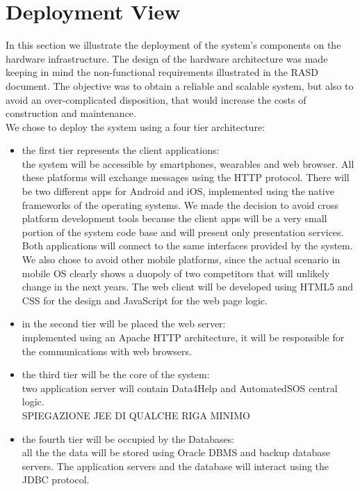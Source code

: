 \section{Deployment	View}
In this section we illustrate the deployment of the system's components on the hardware infrastructure.
The design of the hardware architecture was made keeping in mind the non-functional requirements illustrated in the RASD document. The objective was to obtain a reliable and scalable system, but also to avoid an over-complicated disposition, that would increase the costs of construction and maintenance. \\
We chose to deploy the system using a four tier architecture:
\begin{itemize}
    \item the first tier represents the client applications:\\the system will be accessible by smartphones, wearables and web browser. All these platforms will exchange messages using the HTTP protocol. There will be two different apps for Android and iOS, implemented using the native frameworks of the operating systems. We made the decision to avoid cross platform development tools because the client apps will be a very small portion of the system code base and will present only presentation services. Both applications will connect to the same interfaces provided by the system. We also chose to avoid other mobile platforms, since the actual scenario in mobile OS clearly shows a duopoly of two competitors that will unlikely change in the next years.
    The web client will be developed using HTML5 and CSS for the design and JavaScript for the web page logic.
    \item in the second tier will be placed the web server:\\implemented using an Apache HTTP architecture, it will be responsible  for the communications with web browsers.
    \item the third tier will be the core of the system:\\two application server will contain Data4Help and AutomatedSOS central logic.\\SPIEGAZIONE JEE DI QUALCHE RIGA MINIMO
    \item the fourth tier will be occupied by the Databases:\\all the the data will be stored using Oracle DBMS and backup database servers. The application servers and the database will interact using the JDBC protocol.
\end{itemize}

